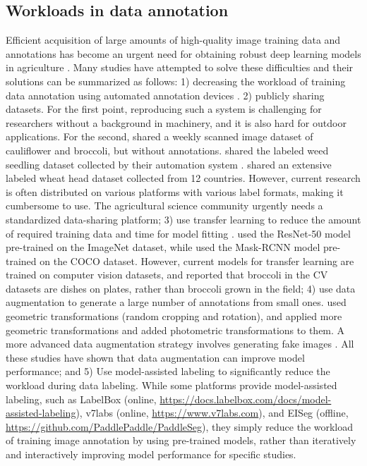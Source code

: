 \subsection{Workloads in data annotation}
Efficient acquisition of large amounts of high-quality image training data and annotations has become an urgent need for obtaining robust deep learning models in agriculture \citep{yang_applications_2021}. Many studies have attempted to solve these difficulties and their solutions can be summarized as follows: 1) decreasing the workload of training data annotation using automated annotation devices \citep{beck_embedded_2020}. 2) publicly sharing datasets. For the first point, reproducing such a system is challenging for researchers without a background in machinery, and it is also hard for outdoor applications. For the second, \citet{bender_ladybird_2019} shared a weekly scanned image dataset of cauliflower and broccoli, but without annotations. \citet{beck_weed_2020} shared the labeled weed seedling dataset collected by their automation system \citep{beck_embedded_2020}. \citet{david_global_2021} shared an extensive labeled wheat head dataset collected from 12 countries. However, current research is often distributed on various platforms with various label formats, making it cumbersome to use. The agricultural science community urgently needs a standardized data-sharing platform; 3) use transfer learning to reduce the amount of required training data and time for model fitting \citep{yang_applications_2021}. \cite{desai_automatic_2019} used the ResNet-50 model pre-trained on the ImageNet dataset, while \citet{blok_effect_2021} used the Mask-RCNN model pre-trained on the COCO dataset. However, current models for transfer learning are trained on computer vision datasets, and \cite{blok_effect_2021} reported that broccoli in the CV datasets are dishes on plates, rather than broccoli grown in the field; 4) use data augmentation to generate a large number of annotations from small ones. \citet{zhou_monitoring_2020} used geometric transformations (random cropping and rotation), and \citet{blok_effect_2021} applied more geometric transformations and added photometric transformations to them. A more advanced data augmentation strategy involves generating fake images \citep{nesteruk_image_2021}. All these studies have shown that data augmentation can improve model performance; and 5) Use model-assisted labeling to significantly reduce the workload during data labeling. While some platforms provide model-assisted labeling, such as LabelBox (online, \url{https://docs.labelbox.com/docs/model-assisted-labeling}), v7labs (online, \url{https://www.v7labs.com}), and EISeg (offline, \url{https://github.com/PaddlePaddle/PaddleSeg}), they simply reduce the workload of training image annotation by using pre-trained models, rather than iteratively and interactively improving model performance for specific studies.

